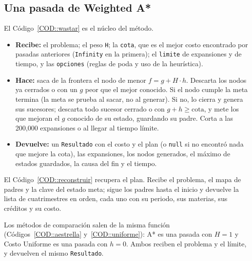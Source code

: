 \subsection{Una pasada de Weighted A*}
El Código~\ref{COD::wastar} es el núcleo del método.
\begin{itemize}
    \item \textbf{Recibe:} el problema; el peso \texttt{H}; la \texttt{cota}, que es el mejor costo encontrado por pasadas anteriores (\texttt{Infinity} en la primera); el \texttt{limite} de expansiones y de tiempo, y las \texttt{opciones} (reglas de poda y uso de la heurística).
    \item \textbf{Hace:} saca de la frontera el nodo de menor $f = g + H \cdot h$. Descarta los nodos ya cerrados o con un $g$ peor que el mejor conocido. Si el nodo cumple la meta termina (la meta se prueba al sacar, no al generar). Si no, lo cierra y genera sus sucesores; descarta todo sucesor cerrado o con $g + h \geq \text{cota}$, y mete los que mejoran el $g$ conocido de su estado, guardando su padre. Corta a las 200,000 expansiones o al llegar al tiempo límite.
    \item \textbf{Devuelve:} un \texttt{Resultado} con el costo y el plan (o \texttt{null} si no encontró nada que mejore la cota), las expansiones, los nodos generados, el máximo de estados guardados, la causa del fin y el tiempo.
\end{itemize}


El Código~\ref{COD::reconstruir} recupera el plan. Recibe el problema, el mapa de padres y la clave del estado meta; sigue los padres hasta el inicio y devuelve la lista de cuatrimestres en orden, cada uno con su periodo, sus materias, sus créditos y su costo.


Los métodos de comparación salen de la misma función (Códigos~\ref{COD::aestrella} y~\ref{COD::uniforme}): A* es una pasada con $H = 1$ y Costo Uniforme es una pasada con $h = 0$. Ambos reciben el problema y el límite, y devuelven el mismo \texttt{Resultado}.



